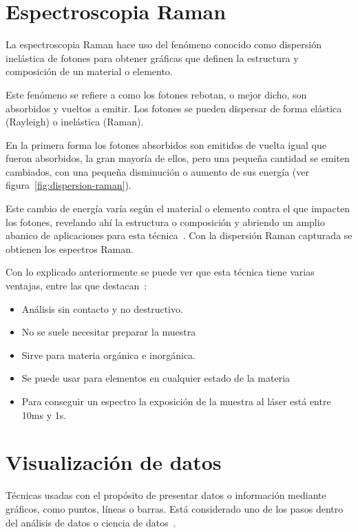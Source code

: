 
\section{Espectroscopia Raman}\label{def:raman}
La espectroscopia Raman hace uso del fenómeno conocido como dispersión
inelástica de fotones para obtener gráficas que definen la estructura y
composición de un material o elemento.

Este fenómeno se refiere a como los fotones rebotan, o mejor dicho, son
absorbidos y vueltos a emitir. Los fotones se pueden
dispersar de forma elástica (Rayleigh) o inelástica (Raman).

En la primera forma los fotones absorbidos son emitidos de vuelta igual que
fueron absorbidos, la gran mayoría de ellos, pero una pequeña cantidad se emiten
cambiados, con una pequeña disminución o aumento de sus energía (ver
figura~\ref{fig:dispersion-raman}).

Este cambio de energía varía según el material o elemento contra el que impacten
los fotones, revelando ahí la estructura o composición y abriendo un amplio
abanico de aplicaciones para esta
técnica~\cite{what-is-raman,wiki:raman-scatter}. Con la dispersión Raman
capturada se obtienen los espectros Raman.


Con lo explicado anteriormente se puede ver que esta técnica tiene varias
ventajas, entre las que destacan~\cite{what-is-raman}:
\begin{itemize}
	\tightlist
	\item Análisis sin contacto y no destructivo.
	\item No se suele necesitar preparar la muestra
	\item Sirve para materia orgánica e inorgánica.
	\item Se puede usar para elementos en cualquier estado de la materia
	\item Para conseguir un espectro la exposición de la muestra al láser está
	entre 10ms y 1s.
\end{itemize}

\section{Visualización de datos}

Técnicas usadas con el propósito de presentar datos o información mediante
gráficos, como puntos, líneas o barras. Está considerado uno de los pasos dentro
del análisis de datos o ciencia de datos~\cite{wiki:dataviz}.

